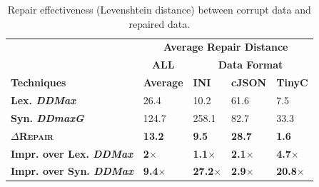 \documentclass[sigconf,review,anonymous]{acmart}
\newcommand{\approach}{\textsc{$\Delta$Repair}\xspace}
\newcommand{\ddmax}{\textit{DDMax}\xspace}
\newcommand{\ddmaxg}{\textit{DDmaxG}\xspace}
\begin{document}

\begin{table}[!tbp]
\footnotesize
\caption{Repair effectiveness (Levenshtein distance) between corrupt data and repaired data.}
\begin{tabular}{|p{3.0cm}|p{1cm}|p{1cm}|p{1cm}|p{1cm}|}
\hline
 &  \multicolumn{4}{c|}{\textbf{Average Repair Distance}}  \\
&  \multicolumn{1}{c|}{\textbf{ALL}} &   \multicolumn{3}{c|}{\textbf{Data Format}}  \\
\textbf{Techniques} & \textbf{Average}  & \textbf{INI} & \textbf{cJSON} & \textbf{TinyC} \\
\hline
\textbf{Lex. \ddmax} & 26.4 & {10.2} &  61.6 &  7.5 \\
\textbf{Syn. \ddmaxg} & 124.7 &  258.1 & 82.7 &  33.3 \\
\hline
\textbf{\approach} & \textbf{13.2}  & \textbf{9.5} &  \textbf{28.7} & \textbf{1.6} \\
\hline
\textbf{Impr. over Lex. \ddmax} & \textbf{2$\times$} & \textbf{1.1$\times$} & \textbf{2.1$\times$} & \textbf{4.7$\times$} \\
\textbf{Impr. over Syn. \ddmax} & \textbf{9.4$\times$} & \textbf{27.2$\times$} & \textbf{2.9$\times$} & \textbf{20.8$\times$} \\
\hline
\end{tabular}
\label{tab:datarepairquality}
\end{table}
\end{document}
